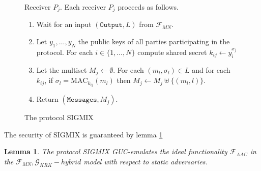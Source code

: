 \documentclass{acm_proc_article-sp}
\begin{document}
\begin{figure}
{\begin{minipage}[t]{1\columnwidth}
Receiver $P_j$. Each receiver $P_j$ proceeds as follows.
\begin{enumerate}
    \item Wait for an input $(\mathtt{Output}, L)$ from $\mathcal{F}_{MN}$.
    \item Let $y_1, \ldots, y_N$ the public keys of all parties participating in
          the protocol. For each $i \in \{1, \ldots, N\}$ compute shared secret
          $k_{ij} \leftarrow  y_{i}^{x_j}$
    \item Let the multiset $M_j \leftarrow \emptyset$. For each $(m_l, \sigma_l) \in L$
          and for each $k_{ij}$, if $\sigma_l = \mathrm{MAC}_{k_{ij}}(m_l)$ then
          $M_j \leftarrow M_j \uplus \{(m_l, l)\}$.
    \item Return $(\mathtt{Messages}, M_j)$.
\end{enumerate}

\end{minipage}}
\caption{The protocol SIGMIX}
\label{SIGMIX}
\end{figure}

The security of SIGMIX is guaranteed by lemma \ref{lemma:sigmix}

\newtheorem{lemma}{Lemma}

\begin{lemma} 
The protocol SIGMIX GUC-emulates the ideal functionality $\mathcal{F}_{AAC}$ in the
$\mathcal{F}_{MN}, \bar{\mathcal{G}}_{KRK}-hybrid$ model with respect to static adversaries.
\label{lemma:sigmix}
\end{lemma}
\end{document}
